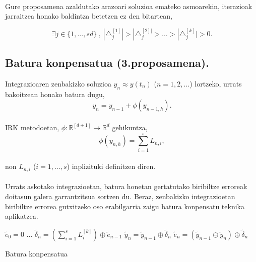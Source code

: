 \paragraph*{} Gure proposamena azaldutako arazoari soluzioa emateko asmoarekin, iterazioak jarraitzea honako baldintza betetzen ez den bitartean,

\begin{equation}
\exists j \in \{1,\dots,sd\} \ , \ |\triangle_j^{[1]}| >|\triangle_j^{[2]|}>\dots>|\triangle_j^{[k]}|>0.
\end{equation}


\subsection{Batura konpensatua (3.proposamena).}

Integrazioaren zenbakizko soluzioa  $y_n \approx y(t_n)$ ($n=1,2,\dots$) lortzeko, urrats bakoitzean honako batura dugu,
\begin{equation*}
y_n=y_{n-1} + \phi(y_{n-1,h}).
\end{equation*}   

\paragraph*{} IRK metodoetan, $\phi: \mathbb{R}^{[d+1]} \rightarrow \mathbb{R}^d$ gehikuntza,
\begin{equation*}
\phi(y_{n,h})=\sum\limits_{i=1}^{s} L_{n,i},
\end{equation*}

\paragraph*{} non $L_{n,i}$ ($i=1,\dots,s$) inplizituki definitzen diren.

\paragraph*{} Urrats askotako integrazioetan, batura honetan gertatutako biribiltze erroreak doitasun galera garrantzitsua sortzen du. Beraz, zenbakizko integrazioetan biribiltze errorea gutxitzeko oso erabilgarria zaigu batura konpensatu teknika aplikatzea.

\begin{algorithm}[h]
 \BlankLine
  $\tilde {e}_0=0$\;
  \BlankLine
  {
   $\dots$\;
   \BlankLine
    $\tilde {\delta}_{n}= (\sum\limits_{i=1}^{s} L_{i}^{[k]}) \oplus \tilde {e}_{n-1} $\;
    $\tilde {y}_n=\tilde{y}_{n-1} \oplus \tilde{\delta}_n$\;
    $\tilde {e}_{n}=(\tilde{y}_{n-1} \ominus \tilde{y}_n)\oplus \tilde{\delta}_n$\;            
   \BlankLine
 }
 \caption{Batura konpensatua}
\end{algorithm}

